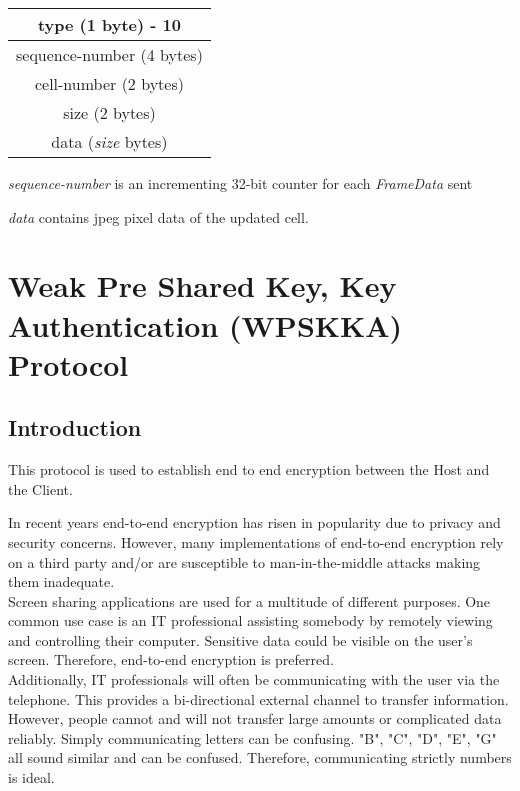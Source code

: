 \documentclass{article}
\begin{document}
    \begin{center}
        \begin{tabular}{|c|}
            \hline
            type (1 byte) - 10        \\
            \hline
            sequence-number (4 bytes) \\
            \hline
            cell-number (2 bytes)     \\
            \hline
            size (2 bytes)            \\
            \hline
            data (\emph{size} bytes)  \\
            \hline
        \end{tabular}
    \end{center}

    \emph{sequence-number} is an incrementing 32-bit counter for each \emph{FrameData} sent

    \emph{data} contains jpeg pixel data of the updated cell.

    \newpage
    \section{Weak Pre Shared Key, Key Authentication (WPSKKA) Protocol}

    \subsection{Introduction}

    This protocol is used to establish end to end encryption between the Host and the Client.

    In recent years end-to-end encryption has risen in popularity due to privacy and
    security concerns. However, many implementations of end-to-end encryption rely
    on a third party and/or are susceptible to man-in-the-middle attacks making them
    inadequate.\\

    Screen sharing applications are used for a multitude of different purposes. One
    common use case is an IT professional assisting somebody by remotely viewing and
    controlling their computer. Sensitive data could be visible on the user's
    screen. Therefore, end-to-end encryption is preferred.\\

    Additionally, IT professionals will often be communicating with the user via the
    telephone. This provides a bi-directional external channel to transfer
    information. However, people cannot and will not transfer large amounts or
    complicated data reliably. Simply communicating letters can be confusing. "B",
    "C", "D", "E", "G" all sound similar and can be confused. Therefore,
    communicating strictly numbers is ideal.\\
\end{document}
